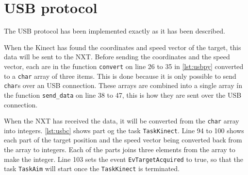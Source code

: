 \section{USB protocol}
The USB protocol has been implemented exactly as it has been described.

When the Kinect has found the coordinates and speed vector of the target, this data will be sent to the NXT. Before sending the coordinates and the speed vector, each are in the function \texttt{convert} on line 26 to 35 in \autoref{lst:usbpy} converted to a \texttt{char} array of three items. This is done because it is only possible to send \texttt{char}s over an USB connection. These arrays are combined into a single array ín the function \texttt{send\_data} on line 38 to 47, this is how they are sent over the USB connection.



When the NXT has received the data, it will be converted from the \texttt{char} array into integers. \autoref{lst:usbc} shows part og the task \texttt{TaskKinect}. Line 94 to 100 shows each part of the target position and the speed vector being converted back from the array to integers. Each of the parts joins three elements from the array to make the integer. 
Line 103 sets the event \texttt{EvTargetAcquired} to true, so that the task \texttt{TaskAim} will start once the \texttt{TaskKinect} is terminated.

